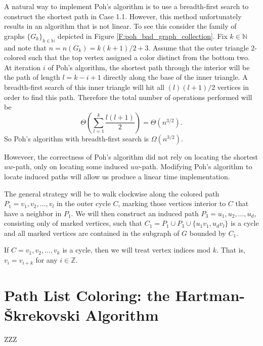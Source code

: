 \documentclass[12pt,letterpaper]{article}
\theoremstyle{plain}
\theoremstyle{definition}
\theoremstyle{break}
\begin{document}
A natural way to implement Poh's algorithm is to use a breadth-first search to
construct the shortest path in Case 1.1. However, this method unfortunately
results in an algorithm that is not linear. To see this consider the family of
graphs $\{G_k\}_{k\in\mathbb{N}}$ depicted in
Figure \ref{F:poh_bad_graph_collection}. Fix $k\in\mathbb{N}$ and note that
$n=n(G_k)=k(k+1)/2+3$. Assume
that the outer triangle $2$-colored such that the top vertex
assigned a color distinct from the bottom two. At iteration $i$ of Poh's
algorithm, the shortest path through the interior will be the path of length
$l=k-i+1$ directly along the base of the inner triangle. A breadth-first search
of this inner triangle will hit all $(l)(l+1)/2$ vertices in order to find this
path. Therefore the total number of operations performed will be
\[
    \Theta\left( \sum_{l=1}^k\frac{l(l+1)}{2} \right)=\Theta(n^{3/2}).
\]
So Poh's algorithm with breadth-first search is $\Omega(n^{3/2})$.

Howeveer, the correctness of Poh's algorithm did not rely on
locating the shortest $uw$-path, only on locating some induced $uw$-path.
Modifying Poh's algorithm to locate induced paths will allow us produce a
linear time implementation.

The general strategy will be to walk clockwise along the colored path
$P_1=v_1,v_2,\ldots,v_l$ in the outer cycle $C$, marking those vertices
interior to $C$ that have a neighbor in $P_1$. We will then construct an
induced path $P_3=u_1,u_2,\ldots,u_d$, consisting only of marked vertices,
such that $C_1=P_1\cup P_3\cup\{u_1v_1,u_dv_l\}$ is a cycle and all marked
vertices are contained in the subgraph of $G$ bounded by $C_1$. 

If $C=v_1,v_2,\ldots,v_k$ is a cycle,
then we will treat vertex indices mod $k$. That is, $v_i=v_{i+k}$ for any
$i\in\mathbb{Z}$.




\section{Path List Coloring: the Hartman-\v{S}krekovski Algorithm}

ZZZ
\end{document}
